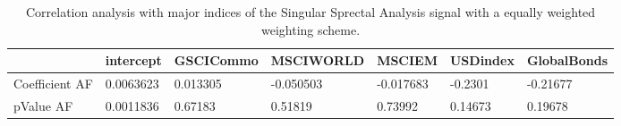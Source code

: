 \begin{table}[H]
\centering
\begin{tabular}{lllllll}
& intercept & GSCICommo & MSCIWORLD & MSCIEM & USDindex & GlobalBonds \\ 
\hline 
Coefficient AF & 0.0063623 & 0.013305 & -0.050503 & -0.017683 & -0.2301 & -0.21677 \\ 
pValue AF & 0.0011836 & 0.67183 & 0.51819 & 0.73992 & 0.14673 & 0.19678 \\ 
\hline
\end{tabular}
\caption{Correlation analysis with major indices of the Singular Sprectal Analysis signal with a equally weighted weighting scheme.}
\label{SSA_EW_AFACTOR}
\end{table}